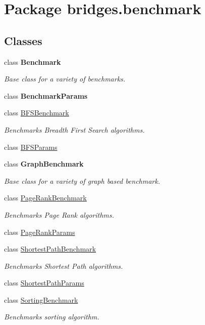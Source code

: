 \hypertarget{namespacebridges_1_1benchmark}{}\section{Package bridges.\+benchmark}
\label{namespacebridges_1_1benchmark}
\subsection*{Classes}
\begin{DoxyCompactItemize}
\item 
class {\bfseries Benchmark}
\begin{DoxyCompactList}\small\item\em Base class for a variety of benchmarks. \end{DoxyCompactList}\item 
class {\bfseries Benchmark\+Params}
\item 
class \mbox{\hyperlink{classbridges_1_1benchmark_1_1_b_f_s_benchmark}{B\+F\+S\+Benchmark}}
\begin{DoxyCompactList}\small\item\em Benchmarks Breadth First Search algorithms. \end{DoxyCompactList}\item 
class \mbox{\hyperlink{classbridges_1_1benchmark_1_1_b_f_s_params}{B\+F\+S\+Params}}
\item 
class {\bfseries Graph\+Benchmark}
\begin{DoxyCompactList}\small\item\em Base class for a variety of graph based benchmark. \end{DoxyCompactList}\item 
class \mbox{\hyperlink{classbridges_1_1benchmark_1_1_page_rank_benchmark}{Page\+Rank\+Benchmark}}
\begin{DoxyCompactList}\small\item\em Benchmarks Page Rank algorithms. \end{DoxyCompactList}\item 
class \mbox{\hyperlink{classbridges_1_1benchmark_1_1_page_rank_params}{Page\+Rank\+Params}}
\item 
class \mbox{\hyperlink{classbridges_1_1benchmark_1_1_shortest_path_benchmark}{Shortest\+Path\+Benchmark}}
\begin{DoxyCompactList}\small\item\em Benchmarks Shortest Path algorithms. \end{DoxyCompactList}\item 
class \mbox{\hyperlink{classbridges_1_1benchmark_1_1_shortest_path_params}{Shortest\+Path\+Params}}
\item 
class \mbox{\hyperlink{classbridges_1_1benchmark_1_1_sorting_benchmark}{Sorting\+Benchmark}}
\begin{DoxyCompactList}\small\item\em Benchmarks sorting algorithm. \end{DoxyCompactList}\end{DoxyCompactItemize}
